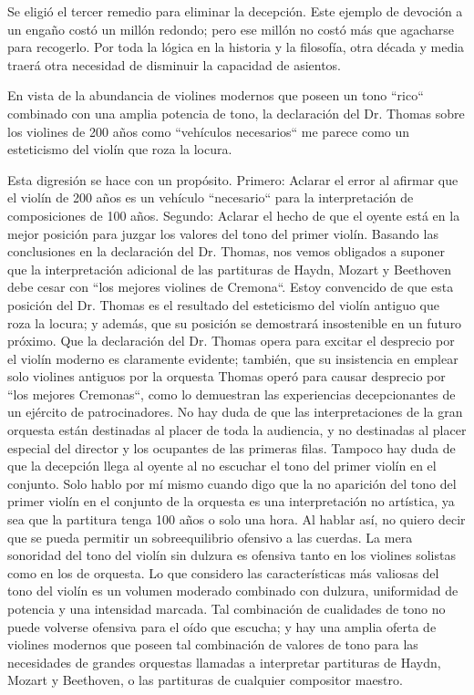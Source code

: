\documentclass[12pt]{book}
\begin{document}
Se eligió el tercer remedio para eliminar la decepción. Este ejemplo de devoción a un engaño costó un millón redondo; pero ese millón no costó más que agacharse para recogerlo. Por toda la lógica en la historia y la filosofía, otra década y media traerá otra necesidad de disminuir la capacidad de asientos.

En vista de la abundancia de violines modernos que poseen un tono ``rico`` combinado con una amplia potencia de tono, la declaración del Dr. Thomas sobre los violines de 200 años como ``vehículos necesarios`` me parece como un esteticismo del violín que roza la locura.

Esta digresión se hace con un propósito. Primero: Aclarar el error al afirmar que el violín de 200 años es un vehículo ``necesario`` para la interpretación de composiciones de 100 años. Segundo: Aclarar el hecho de que el oyente está en la mejor posición para juzgar los valores del tono del primer violín. Basando las conclusiones en la declaración del Dr. Thomas, nos vemos obligados a suponer que la interpretación adicional de las partituras de Haydn, Mozart y Beethoven debe cesar con ``los mejores violines de Cremona``. Estoy convencido de que esta posición del Dr. Thomas es el resultado del esteticismo del violín antiguo que roza la locura; y además, que su posición se demostrará insostenible en un futuro próximo. Que la declaración del Dr. Thomas opera para excitar el desprecio por el violín moderno es claramente evidente; también, que su insistencia en emplear solo violines antiguos por la orquesta Thomas operó para causar desprecio por ``los mejores Cremonas``, como lo demuestran las experiencias decepcionantes de un ejército de patrocinadores. No hay duda de que las interpretaciones de la gran orquesta están destinadas al placer de toda la audiencia, y no destinadas al placer especial del director y los ocupantes de las primeras filas. Tampoco hay duda de que la decepción llega al oyente al no escuchar el tono del primer violín en el conjunto. Solo hablo por mí mismo cuando digo que la no aparición del tono del primer violín en el conjunto de la orquesta es una interpretación no artística, ya sea que la partitura tenga 100 años o solo una hora. Al hablar así, no quiero decir que se pueda permitir un sobreequilibrio ofensivo a las cuerdas. La mera sonoridad del tono del violín sin dulzura es ofensiva tanto en los violines solistas como en los de orquesta. Lo que considero las características más valiosas del tono del violín es un volumen moderado combinado con dulzura, uniformidad de potencia y una intensidad marcada. Tal combinación de cualidades de tono no puede volverse ofensiva para el oído que escucha; y hay una amplia oferta de violines modernos que poseen tal combinación de valores de tono para las necesidades de grandes orquestas llamadas a interpretar partituras de Haydn, Mozart y Beethoven, o las partituras de cualquier compositor maestro.
\end{document}
